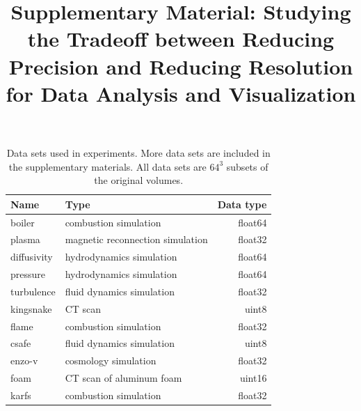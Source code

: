 \documentclass{article}
\title{Supplementary Material: Studying the Tradeoff between Reducing Precision and Reducing Resolution for Data Analysis and Visualization}
\date{}
\begin{document}
\maketitle


\begin{table}[ht]
        \caption{Data sets used in experiments. More data sets are included in the
        supplementary materials. All data sets are $64^3$ subsets of the original volumes.}
  \centering
  \begin{tabular}{llr}
  \toprule
  Name & Type & Data type \\
  \midrule
  boiler & combustion simulation& float64\\
  plasma & magnetic reconnection simulation& float32\\
  diffusivity & hydrodynamics simulation& float64\\
  pressure & hydrodynamics simulation& float64\\
  turbulence & fluid dynamics simulation& float32\\
  kingsnake & CT scan & uint8\\
  flame & combustion simulation& float32\\
  csafe & fluid dynamics simulation& uint8\\
  enzo-v & cosmology simulation& float32\\
  foam & CT scan of aluminum foam & uint16\\
  karfs & combustion simulation& float32\\
  \bottomrule
  \end{tabular}\label{tbl:data-sets}
\end{table}
\end{document}

